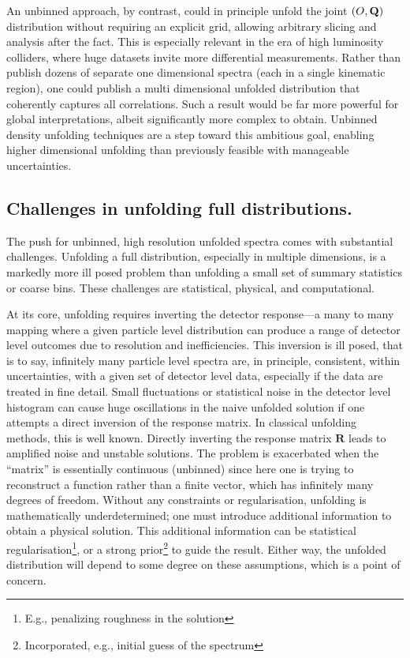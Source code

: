 \begin{itemize}
            An unbinned approach, by contrast, could in principle unfold the joint $(O,\vb{Q})$ distribution without requiring an explicit grid, allowing arbitrary slicing and analysis after the fact.
            This is especially relevant in the era of high luminosity colliders, where huge datasets invite more differential measurements.
            Rather than publish dozens of separate one dimensional spectra (each in a single kinematic region), one could publish a multi dimensional unfolded distribution that coherently captures all correlations.
            Such a result would be far more powerful for global interpretations, albeit significantly more complex to obtain.
            Unbinned density unfolding techniques are a step toward this ambitious goal, enabling higher dimensional unfolding than previously feasible with manageable uncertainties.
    \end{itemize}
    \subsection{Challenges in unfolding full distributions.}
        The push for unbinned, high resolution unfolded spectra comes with substantial challenges.
        Unfolding a full distribution, especially in multiple dimensions, is a markedly more ill posed problem than unfolding a small set of summary statistics or coarse bins.
        These challenges are statistical, physical, and computational.

        At its core, unfolding requires inverting the detector response---a many to many mapping where a given particle level distribution can produce a range of detector level outcomes due to resolution and inefficiencies.
        This inversion is ill posed, that is to say, infinitely many particle level spectra are, in principle, consistent, within uncertainties, with a given set of detector level data, especially if the data are treated in fine detail.
        Small fluctuations or statistical noise in the detector level histogram can cause huge oscillations in the naive unfolded solution if one attempts a direct inversion of the response matrix.
        In classical unfolding methods, this is well known.
        Directly inverting the response matrix $\mathbf{R}$ leads to amplified noise and unstable solutions.
        The problem is exacerbated when the ``matrix'' is essentially continuous (unbinned) since here one is trying to reconstruct a function rather than a finite vector, which has infinitely many degrees of freedom.
        Without any constraints or regularisation, unfolding is mathematically underdetermined; one must introduce additional information to obtain a physical solution.
        This additional information can be statistical regularisation\footnote{E.g., penalizing roughness in the solution}, or a strong prior\footnote{Incorporated, e.g., initial guess of the spectrum} to guide the result.
        Either way, the unfolded distribution will depend to some degree on these assumptions, which is a point of concern.

